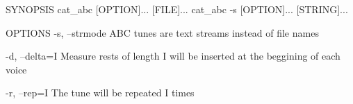 SYNOPSIS
  cat_abc [OPTION]...    [FILE]...
  cat_abc -s [OPTION]... [STRING]...

OPTIONS
  -s, --strmode
    ABC tunes are text streams instead of file names

  -d, --delta=I
    Measure rests of length I will be inserted at the beggining of each voice

  -r, --rep=I
    The tune will be repeated I times
